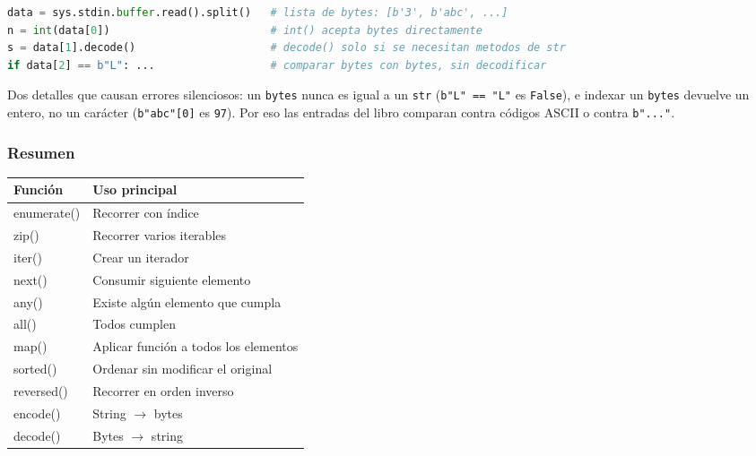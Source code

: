 \begin{lstlisting}[language=Python]
data = sys.stdin.buffer.read().split()   # lista de bytes: [b'3', b'abc', ...]
n = int(data[0])                         # int() acepta bytes directamente
s = data[1].decode()                     # decode() solo si se necesitan metodos de str
if data[2] == b"L": ...                  # comparar bytes con bytes, sin decodificar
\end{lstlisting}

Dos detalles que causan errores silenciosos: un \texttt{bytes} nunca es igual a un
\texttt{str} (\texttt{b"L" == "L"} es \texttt{False}), e indexar un \texttt{bytes}
devuelve un entero, no un carácter (\texttt{b"abc"[0]} es \texttt{97}). Por eso las
entradas del libro comparan contra códigos ASCII o contra \texttt{b"..."}.

\vspace{0.3cm}

\subsubsection*{Resumen}

\begin{center}
\begin{tabular}{|l|l|}
\hline
Función & Uso principal \\ \hline
enumerate() & Recorrer con índice \\ \hline
zip() & Recorrer varios iterables \\ \hline
iter() & Crear un iterador \\ \hline
next() & Consumir siguiente elemento \\ \hline
any() & Existe algún elemento que cumpla \\ \hline
all() & Todos cumplen \\ \hline
map() & Aplicar función a todos los elementos \\ \hline
sorted() & Ordenar sin modificar el original \\ \hline
reversed() & Recorrer en orden inverso \\ \hline
encode() & String $\rightarrow$ bytes \\ \hline
decode() & Bytes $\rightarrow$ string \\ \hline
\end{tabular}
\end{center}
